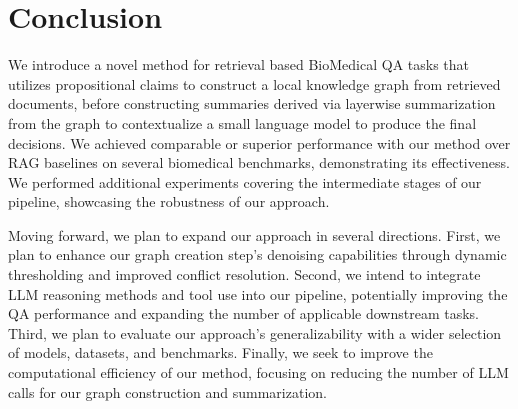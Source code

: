 \documentclass[11pt]{article}
\theoremstyle{definition}
\begin{document}
\section{Conclusion}

We introduce a novel method for retrieval based BioMedical QA tasks that utilizes propositional claims to construct a local knowledge graph from retrieved documents, before constructing summaries derived via layerwise summarization from the graph to contextualize a small language model to produce the final decisions. We achieved comparable or superior performance with our method over RAG baselines on several biomedical benchmarks, demonstrating its effectiveness. We performed additional experiments covering the intermediate stages of our pipeline, showcasing the robustness of our approach. 

Moving forward, we plan to expand our approach in several directions. First, we plan to enhance our graph creation step's denoising capabilities through dynamic thresholding and improved conflict resolution. Second, we intend to integrate LLM reasoning methods and tool use into our pipeline, potentially improving the QA performance and expanding the number of applicable downstream tasks. Third, we plan to evaluate our approach's generalizability with a wider selection of models, datasets, and benchmarks. Finally, we seek to improve the computational efficiency of our method, focusing on reducing the number of LLM calls for our graph construction and summarization.
%

\end{document}
